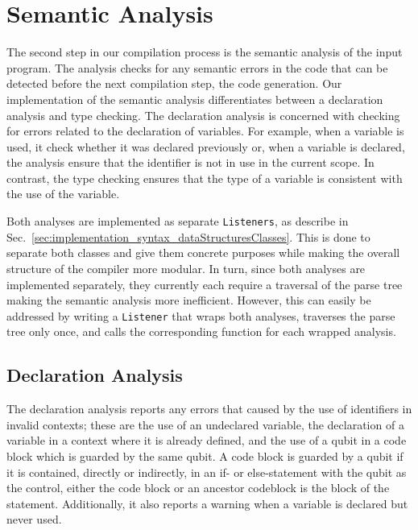 \section{Semantic Analysis}
\label{sec:implementation_semenaticAnalayis}
The second step in our compilation process is the semantic analysis of the input program. The analysis checks for any semantic errors in the code that can be detected before the next compilation step, the code generation. Our implementation of the semantic analysis differentiates between a declaration analysis and type checking. The declaration analysis is concerned with checking for errors related to the declaration of variables. For example, when a variable is used, it check whether it was declared previously or, when a variable is declared, the analysis ensure that the identifier is not in use in the current scope. In contrast, the type checking ensures that the type of a variable is consistent with the use of the variable. 

Both analyses are implemented as separate \texttt{Listeners}, as describe in Sec.~\ref{sec:implementation_syntax_dataStructuresClasses}.
This is done to separate both classes and give them concrete purposes while making the overall structure of the compiler more modular. In turn, since both analyses are implemented separately, they currently each require a traversal of the parse tree making the semantic analysis more inefficient. However, this can easily be addressed by writing a \texttt{Listener} that wraps both analyses, traverses the parse tree only once, and calls the corresponding function for each wrapped analysis.     

\subsection{Declaration Analysis}
\label{sec:implementation_declarationAnalayis}
The declaration analysis reports any errors that caused by the use of identifiers in invalid contexts; these are the use of an undeclared variable, the declaration of a variable in a context where it is already defined, and the use of a qubit in a code block which is guarded by the same qubit. A code block is guarded by a qubit if it is contained, directly or indirectly, in an if- or else-statement with the qubit as the control, \ie either the code block or an ancestor codeblock is the block of the statement.
Additionally, it also reports a warning when a variable is declared but never used.

